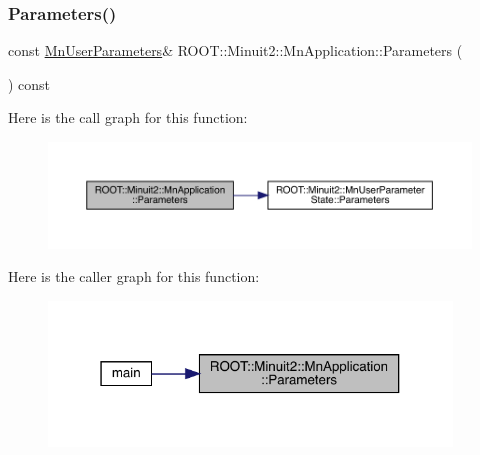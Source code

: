\mbox{\label{classROOT_1_1Minuit2_1_1MnApplication_a8a6af4bd7d2f8af8524bca7a67b2f62d}} 
\subsubsection{\texorpdfstring{Parameters()}{Parameters()}\hspace{0.1cm}{\footnotesize\ttfamily [1/2]}}
{\footnotesize\ttfamily const \mbox{\hyperlink{classROOT_1_1Minuit2_1_1MnUserParameters}{Mn\+User\+Parameters}}\& R\+O\+O\+T\+::\+Minuit2\+::\+Mn\+Application\+::\+Parameters (\begin{DoxyParamCaption}{ }\end{DoxyParamCaption}) const\hspace{0.3cm}{\ttfamily [inline]}}

Here is the call graph for this function\+:
\nopagebreak
\begin{figure}[H]
\begin{center}
\leavevmode
\includegraphics[width=350pt]{df/dd5/classROOT_1_1Minuit2_1_1MnApplication_a8a6af4bd7d2f8af8524bca7a67b2f62d_cgraph}
\end{center}
\end{figure}
Here is the caller graph for this function\+:\nopagebreak
\begin{figure}[H]
\begin{center}
\leavevmode
\includegraphics[width=304pt]{df/dd5/classROOT_1_1Minuit2_1_1MnApplication_a8a6af4bd7d2f8af8524bca7a67b2f62d_icgraph}
\end{center}
\end{figure}
\mbox{\label{classROOT_1_1Minuit2_1_1MnApplication_a8a6af4bd7d2f8af8524bca7a67b2f62d}} 
